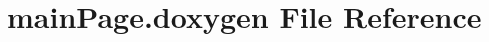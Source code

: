 \hypertarget{main_page_8doxygen}{
\section{mainPage.doxygen File Reference}
\label{main_page_8doxygen}
}
